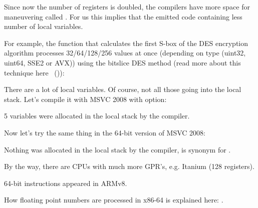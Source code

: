 
Since now the number of registers is doubled, the compilers have more space for maneuvering called 
.
For us this implies that the emitted code containing less number of local variables.


For example, the function that calculates the first S-box of the DES encryption algorithm processes
32/64/128/256 values at once (depending on  type (uint32, uint64, SSE2 or AVX)) 
using the bitslice DES method
(read more about this technique here ~()):



There are a lot of local variables. 
Of course, not all those going into the local stack.
Let's compile it with MSVC 2008 with  option:



5 variables were allocated in the local stack by the compiler.

Now let's try the same thing in the 64-bit version of MSVC 2008:



Nothing was allocated in the local stack by the compiler,  is synonym for .

\iffalse

By the way, we can see here that the function saved the \RCX and \RDX registers in space allocated by the \gls{caller},
but \Reg{8} and \Reg{9} were not saved but used from the beginning.
\fi

By the way, there are CPUs with much more \ac{GPR}'s, e.g. Itanium (128 registers).


64-bit instructions appeared in ARMv8.


How floating point numbers are processed in x86-64 is explained here: .
